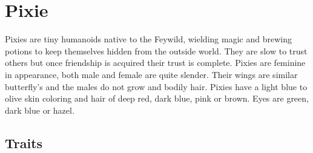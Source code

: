 \documentclass{article}
\begin{document}
\section*{Pixie}

Pixies are tiny humanoids native to the Feywild, wielding magic and brewing potions to keep themselves hidden from the outside world. They are slow to trust others but once friendship is acquired their trust is complete.
Pixies are feminine in appearance, both male and female are quite slender. Their wings are similar butterfly's and the males do not grow and bodily hair. Pixies have a light blue to olive skin coloring and hair of deep red, dark blue, pink or brown. Eyes are green, dark blue or hazel.

\subsection*{Traits}
\end{document}
